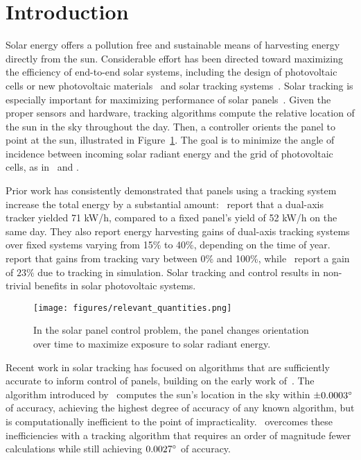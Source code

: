\documentclass{article}
\begin{document}
\section{Introduction}
Solar energy offers a pollution free and sustainable means of harvesting energy directly from the sun. Considerable effort has been directed toward maximizing the efficiency of end-to-end solar systems, including the design of photovoltaic cells or new photovoltaic materials~\cite{li2012molecular} and solar tracking systems~\cite{camacho2012control}. Solar tracking is especially important for maximizing performance of solar panels~\cite{Eke2012,Rizk2008,King2001}. Given the proper sensors and hardware, tracking algorithms compute the relative location of the sun in the sky throughout the day. Then, a controller orients the panel to point at the sun, illustrated in Figure~\ref{fig:solar}. The goal is to minimize the angle of incidence between incoming solar radiant energy and the grid of photovoltaic cells, as in~\citet{Eke2012} and \citet{Benghanem2011}.

Prior work has consistently demonstrated that panels using a tracking system increase the total energy by a substantial amount:~\citet{Eke2012} report that a dual-axis tracker yielded 71 kW/h, compared to a fixed panel's yield of 52 kW/h on the same day. They also report energy harvesting gains of dual-axis tracking systems over fixed systems varying from 15\% to 40\%, depending on the time of year.~\citet{mousazadeh2009review} report that gains from tracking vary between 0\% and 100\%, while~\citet{clifford2004design} report a gain of $23\%$ due to tracking in simulation. Solar tracking and control results in non-trivial benefits in solar photovoltaic systems.

\begin{figure}[b!]
\begin{center}
\texttt{[image: figures/relevant\_quantities.png]}
\caption{In the solar panel control problem, the panel changes orientation over time to maximize exposure to solar radiant energy.}
\label{fig:solar}
\end{center}
\end{figure}

Recent work in solar tracking has focused on algorithms that are sufficiently accurate to inform control of panels, building on the early work of~\citet{spencer1971fourier}. The algorithm introduced by~\citet{reda2004solar} computes the sun's location in the sky within $\pm 0.0003\degree$ of accuracy, achieving the highest degree of accuracy of any known algorithm, but is computationally inefficient to the point of impracticality.~\citet{Grena2008} overcomes these inefficiencies with a tracking algorithm that requires an order of magnitude fewer calculations while still achieving $0.0027\degree$ of accuracy.
\end{document}
